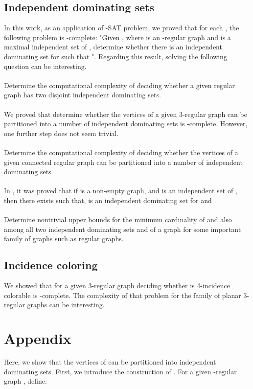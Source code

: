 \documentclass[
final
]{dmtcs-episciences}
\begin{document}
\subsection{Independent dominating sets}
In this work, as an application of -SAT problem, we proved that for each , the following problem is -complete: "Given , where  is an -regular graph and  is  a  maximal independent set of , determine whether
there is an independent dominating set  for  such that ".
Regarding this result, solving the following question can be interesting.
\\ \\
\textbullet    Determine the computational complexity of deciding whether a given  regular graph has two disjoint independent dominating sets.
\\ \\
We proved that determine  whether the vertices of a given  3-regular graph can be partitioned into a number of independent dominating sets is  -complete. However, one further step does not seem trivial.
\\ \\
\textbullet  Determine the computational complexity of deciding whether  the vertices of a given  connected regular graph can be partitioned into a number of independent dominating sets.
\\ \\
In \cite{dehhh}, it was  proved that
if  is a non-empty graph, and  is an independent set of , then there exists  such that,  is an independent dominating set for  and
.
\\ \\
\textbullet    Determine  nontrivial upper bounds for the minimum cardinality of  and also  among all  two  independent dominating sets  and  of a graph  for some important family of graphs such as regular graphs.

\subsection{Incidence coloring}


We showed that for a given 3-regular graph  deciding whether  is 4-incidence colorable  is -complete. The complexity of that problem for the family of planar 3-regular graphs can be interesting.


\section{Appendix}
Here, we show that the vertices of  can be partitioned into  independent dominating sets.
First, we introduce the construction of . For a given -regular graph , define:
\end{document}
